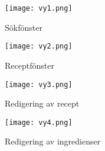 \begin{figure}[h]
  \centering
  \texttt{[image: vy1.png]}
  \caption{Sökfönster}
  \label{fig:vy1}
\end{figure}

\begin{figure}[h]
  \centering
  \texttt{[image: vy2.png]}
  \caption{Receptfönster}
  \label{fig:vy2}
\end{figure}

\begin{figure}[h]
  \centering
  \texttt{[image: vy3.png]}
  \caption{Redigering av recept}
  \label{fig:vy3}
\end{figure}

\begin{figure}[h]
  \centering
  \texttt{[image: vy4.png]}
  \caption{Redigering av ingredienser}
  \label{fig:vy4}
\end{figure}
